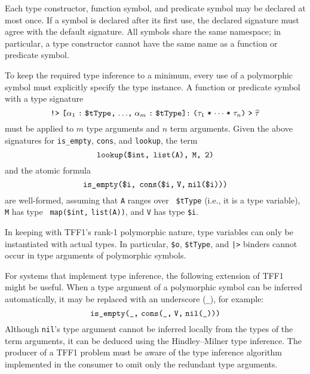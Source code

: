 Each type constructor, function symbol, and predicate symbol may be declared at
most once. If a symbol is declared after its first use, the declared signature
must agree with the default signature. All symbols share the same namespace; in
particular, a type constructor cannot have the same name as a function or
predicate symbol.


 To keep the required type
inference to a minimum, every use of a polymorphic symbol must explicitly
specify the type instance. A function or predicate symbol with a type signature
\[\hbox{{\tt !>} {\tt [$\alpha_1$\;:\;\$tType,\;${\dots}$,\;$\alpha_m$\;:\;\$tType]:\;%
($\tau_1$\;*\;${\cdots}$\;*\;$\tau_n$)\;>\;$\widehat \tau$}}\]
must be applied to $m$ type arguments and $n$ term arguments. Given the above
signatures for {\tt is\_empty}, {\tt cons}, and {\tt lookup}, the term
\[\hbox{\tt lookup(\$int,\;\,list(A),\;\,M,\;\,2)}\]
and the atomic formula
\[\hbox{\tt is\_empty(\$i,\;\,cons(\$i,\;V,\;nil(\$i)))}\]
are well-formed, assuming that {\tt A} ranges over {\tt
\$tType} (i.e., it is a type variable), {\tt M} has type {\tt
map(\$int,} {\tt list(A))}, and {\tt V} has type {\tt \$i}.

In keeping with TFF1's rank-1 polymorphic nature, type variables can only be
instantiated with actual types. In particular, \verb+$o+, \verb+$tType+,
and {\tt |>} binders cannot occur in type arguments of polymorphic symbols.

For systems that implement type inference, the following extension
of TFF1 might be useful. When a type argument of
a polymorphic symbol can be inferred automatically, it may be
replaced with an underscore ({\tt \_}), for example:
\[\hbox{{\tt is\_empty(\_,} {\tt cons(\_,\;V,\;nil(\_)))}}\]
Although {\tt nil}'s type argument cannot be inferred locally from the types of
the term arguments, it can be deduced using the Hindley--Milner type inference.
The producer of a TFF1 problem must be aware of the type inference algorithm
implemented in the consumer to omit only the redundant type arguments.

